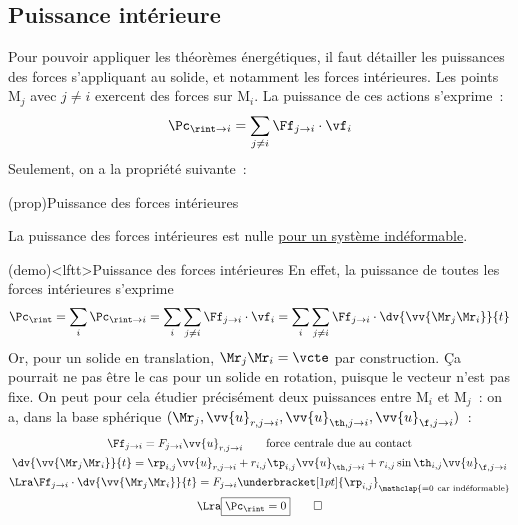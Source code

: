 \documentclass[../../main/main.tex]{subfiles}
\begin{document}
\subsection{Puissance intérieure}
Pour pouvoir appliquer les théorèmes énergétiques, il faut détailler les
puissances des forces s'appliquant au solide, et notamment les forces
intérieures. Les points M$_j$ avec $j\neq i$ exercent des forces sur M$_i$. La
puissance de ces actions s'exprime~:
\[\Pc_{\rint\to i} = \sum_{j\neq i} \Ff_{j\to i}\cdot\vf_i\]
Seulement, on a la propriété suivante~:
\begin{tcb*}(prop){Puissance des forces intérieures}
	\begin{center}
		\begin{bfseries}
			La puissance des forces intérieures est nulle \ul{pour un système
				indéformable}.
		\end{bfseries}
	\end{center}
\end{tcb*}
\begin{tcb*}(demo)<lftt>{Puissance des forces intérieures}
	En effet, la puissance de toutes les forces intérieures s'exprime
	\[
		\Pc_{\rint} =
		\sum_i\Pc_{\rint\to i} =
		\sum_i\sum_{j\neq i}\Ff_{j\to i}\cdot \vf_i =
		\sum_i\sum_{j\neq i}\Ff_{j\to i}\cdot \dv{\vv{\Mr_j\Mr_i}}{t}
	\]
	Or, pour un solide en translation, $\Mr_j\Mr_i = \vcte$ par construction. Ça
	pourrait ne pas être le cas pour un solide en rotation, puisque le vecteur
	n'est pas fixe. On peut pour cela étudier précisément deux puissances entre
	M$_i$ et M$_j$~: on a, dans la base sphérique $(\Mr_j, \vv{u}_{r,j\to i},
		\vv{u}_{\th,j\to i}, \vv{u}_{\f,j\to i})$~:
	\begin{gather*}
		\Ff_{j\to i} = F_{j\to i}\vv{u}_{r,j\to i} \qquad \text{force centrale due au
			contact}\\
		\dv{\vv{\Mr_j\Mr_i}}{t} = \rp_{i,j}\vv{u}_{r,j\to i} +
		r_{i,j}\tp_{i,j}\vv{u}_{\th,j\to i} + r_{i,j}\sin\th_{i,j}\vv{u}_{\f,j\to i}
		\\\Lra
		\Ff_{j\to i}\cdot\dv{\vv{\Mr_j\Mr_i}}{t} = F_{j\to i}
		\underbracket[1pt]{\rp_{i,j}}_{\mathclap{=0~\text{car indéformable}}}
		\\\Lra
		\boxed{\Pc_{\rint} = 0}
		\qed
	\end{gather*}
\end{tcb*}
\end{document}
